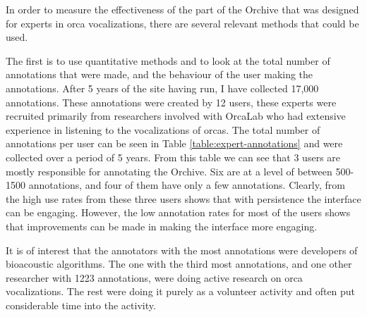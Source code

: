 

\label{chap:expertinterfaceevaluation}

In order to measure the effectiveness of the part of the Orchive that
was designed for experts in orca vocalizations, there are several
relevant methods that could be used.

The first is to use quantitative methods and to look at the total
number of annotations that were made, and the behaviour of the user
making the annotations.  After 5 years of the site having run, I have
collected 17,000 annotations.  These annotations were created by 12
users, these experts were recruited primarily from researchers
involved with OrcaLab who had extensive experience in listening to the
vocalizations of orcas.  The total number of annotations per user can
be seen in Table \ref{table:expert-annotations} and were collected
over a period of 5 years.  From this table we can see that 3 users are
mostly responsible for annotating the Orchive.  Six are at a level of
between 500-1500 annotations, and four of them have only a few
annotations.  Clearly, from the high use rates from these three users
shows that with persistence the interface can be engaging.  However,
the low annotation rates for most of the users shows that improvements
can be made in making the interface more engaging.

It is of interest that the annotators with the most annotations were
developers of bioacoustic algorithms.  The one with the third most
annotations, and one other researcher with 1223 annotations, were
doing active research on orca vocalizations.  The rest were doing it
purely as a volunteer activity and often put considerable time into
the activity.

